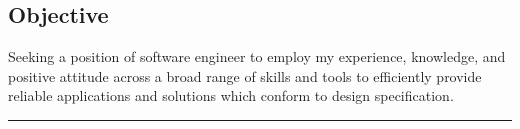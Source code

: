 \documentclass[10pt]{res} %
\begin{document}
\begin{resume}


\section{Objective}
\vspace{8pt} %
Seeking a position of software engineer to employ my experience, knowledge, and positive attitude across a broad range of skills and tools to efficiently provide reliable applications and solutions which conform to design specification.



 
\noindent\rule{\textwidth}{1pt}



\end{resume}
\end{document}
